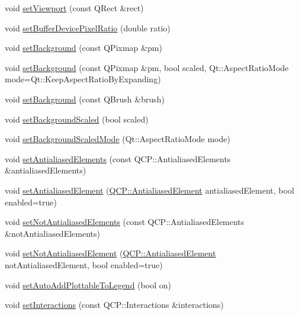 \begin{DoxyCompactItemize}
\item 
void \hyperlink{classQCustomPlot_a3f9bc4b939dd8aaba9339fd09f273fc4}{set\+Viewport} (const Q\+Rect \&rect)
\item 
void \hyperlink{classQCustomPlot_a159162653ad6f8b8bf21263ba5787215}{set\+Buffer\+Device\+Pixel\+Ratio} (double ratio)
\item 
void \hyperlink{classQCustomPlot_a130358592cfca353ff3cf5571b49fb00}{set\+Background} (const Q\+Pixmap \&pm)
\item 
void \hyperlink{classQCustomPlot_a8513971d6aa24d8b0d6a68d45b542130}{set\+Background} (const Q\+Pixmap \&pm, bool scaled, Qt\+::\+Aspect\+Ratio\+Mode mode=Qt\+::\+Keep\+Aspect\+Ratio\+By\+Expanding)
\item 
void \hyperlink{classQCustomPlot_a8ed256cf467bfa7ba1f9feaae62c3bd0}{set\+Background} (const Q\+Brush \&brush)
\item 
void \hyperlink{classQCustomPlot_a36f0fa1317325dc7b7efea615ee2de1f}{set\+Background\+Scaled} (bool scaled)
\item 
void \hyperlink{classQCustomPlot_a4c0eb4865b7949f62e1cb97db04a3de0}{set\+Background\+Scaled\+Mode} (Qt\+::\+Aspect\+Ratio\+Mode mode)
\item 
void \hyperlink{classQCustomPlot_af6f91e5eab1be85f67c556e98c3745e8}{set\+Antialiased\+Elements} (const Q\+C\+P\+::\+Antialiased\+Elements \&antialiased\+Elements)
\item 
void \hyperlink{classQCustomPlot_aeef813bcf7efab8e765f9f87ec454691}{set\+Antialiased\+Element} (\hyperlink{namespaceQCP_ae55dbe315d41fe80f29ba88100843a0c}{Q\+C\+P\+::\+Antialiased\+Element} antialiased\+Element, bool enabled=true)
\item 
void \hyperlink{classQCustomPlot_ae10d685b5eabea2999fb8775ca173c24}{set\+Not\+Antialiased\+Elements} (const Q\+C\+P\+::\+Antialiased\+Elements \&not\+Antialiased\+Elements)
\item 
void \hyperlink{classQCustomPlot_afc657938a707c890e449ae89203a076d}{set\+Not\+Antialiased\+Element} (\hyperlink{namespaceQCP_ae55dbe315d41fe80f29ba88100843a0c}{Q\+C\+P\+::\+Antialiased\+Element} not\+Antialiased\+Element, bool enabled=true)
\item 
void \hyperlink{classQCustomPlot_ad8858410c2db47b7104040a3aa61c3fc}{set\+Auto\+Add\+Plottable\+To\+Legend} (bool on)
\item 
void \hyperlink{classQCustomPlot_a5ee1e2f6ae27419deca53e75907c27e5}{set\+Interactions} (const Q\+C\+P\+::\+Interactions \&interactions)
\item 

\end{DoxyCompactItemize}

